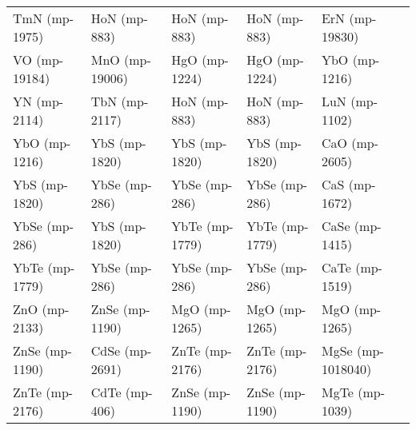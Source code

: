 \begin{longtable}{lllll}
    TmN (mp-1975) &      HoN (mp-883) &        HoN (mp-883) &      HoN (mp-883) &      ErN (mp-19830) \\
    VO (mp-19184) &    MnO (mp-19006) &       HgO (mp-1224) &     HgO (mp-1224) &       YbO (mp-1216) \\
     YN (mp-2114) &     TbN (mp-2117) &        HoN (mp-883) &      HoN (mp-883) &       LuN (mp-1102) \\
    YbO (mp-1216) &     YbS (mp-1820) &       YbS (mp-1820) &     YbS (mp-1820) &       CaO (mp-2605) \\
    YbS (mp-1820) &     YbSe (mp-286) &       YbSe (mp-286) &     YbSe (mp-286) &       CaS (mp-1672) \\
    YbSe (mp-286) &     YbS (mp-1820) &      YbTe (mp-1779) &    YbTe (mp-1779) &      CaSe (mp-1415) \\
   YbTe (mp-1779) &     YbSe (mp-286) &       YbSe (mp-286) &     YbSe (mp-286) &      CaTe (mp-1519) \\
    ZnO (mp-2133) &    ZnSe (mp-1190) &       MgO (mp-1265) &     MgO (mp-1265) &       MgO (mp-1265) \\
   ZnSe (mp-1190) &    CdSe (mp-2691) &      ZnTe (mp-2176) &    ZnTe (mp-2176) &   MgSe (mp-1018040) \\
   ZnTe (mp-2176) &     CdTe (mp-406) &      ZnSe (mp-1190) &    ZnSe (mp-1190) &      MgTe (mp-1039) \\
\end{longtable}
